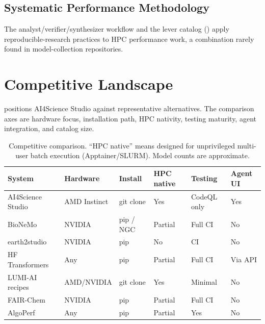 \documentclass[11pt]{article}
\begin{document}
\subsection{Systematic Performance Methodology}
The analyst/verifier/synthesizer workflow and the lever catalog ()
apply reproducible-research practices to HPC performance work, a combination rarely
found in model-collection repositories.

\section{Competitive Landscape}
\label{sec:competition}

 positions AI4Science Studio against representative
alternatives. The comparison axes are hardware focus, installation path, HPC
nativity, testing maturity, agent integration, and catalog size.

\begin{table}[ht]
\centering
\footnotesize
\caption{Competitive comparison. ``HPC native'' means designed for unprivileged
multi-user batch execution (Apptainer/SLURM). Model counts are approximate.}
\label{tab:competition}
\begin{tabular}{@{}p{3.0cm}p{1.9cm}p{1.7cm}p{1.2cm}p{1.5cm}p{1.5cm}@{}}
\toprule
\textbf{System} & \textbf{Hardware} & \textbf{Install} & \textbf{HPC native} & \textbf{Testing} & \textbf{Agent UI} \\
\midrule
AI4Science Studio & AMD Instinct & git clone & Yes & CodeQL only & Yes \\
BioNeMo~\cite{bionemo2024} & NVIDIA & pip / NGC & Partial & Full CI & No \\
earth2studio~\cite{earth2studio2024} & NVIDIA & pip & No & CI & No \\
HF Transformers~\cite{wolf2020huggingface} & Any & pip & Partial & Full CI & Via API \\
LUMI-AI recipes~\cite{lumiairecipes} & AMD/NVIDIA & git clone & Yes & Minimal & No \\
FAIR-Chem~\cite{fairchem2024} & NVIDIA & pip & Partial & Full CI & No \\
AlgoPerf~\cite{dahl2023algoperf} & Any & pip & Partial & Yes & No \\
\bottomrule
\end{tabular}
\end{table}
\end{document}
